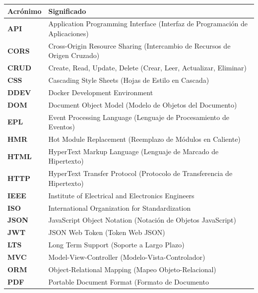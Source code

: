 \documentclass[12pt,a4paper,oneside]{report}
\begin{document}
\begin{longtable}[]{@{}
  >{\raggedright\arraybackslash}p{}
  >{\raggedright\arraybackslash}p{}@{}}
\toprule\noalign{}
\begin{minipage}[b]{\linewidth}\raggedright
Acrónimo
\end{minipage} & \begin{minipage}[b]{\linewidth}\raggedright
Significado
\end{minipage} \\
\midrule\noalign{}
\endhead
\bottomrule\noalign{}
\endlastfoot
\textbf{API} & Application Programming Interface (Interfaz de
Programación de Aplicaciones) \\
\textbf{CORS} & Cross-Origin Resource Sharing (Intercambio de Recursos
de Origen Cruzado) \\
\textbf{CRUD} & Create, Read, Update, Delete (Crear, Leer, Actualizar,
Eliminar) \\
\textbf{CSS} & Cascading Style Sheets (Hojas de Estilo en Cascada) \\
\textbf{DDEV} & Docker Development Environment \\
\textbf{DOM} & Document Object Model (Modelo de Objetos del
Documento) \\
\textbf{EPL} & Event Processing Language (Lenguaje de Procesamiento de
Eventos) \\
\textbf{HMR} & Hot Module Replacement (Reemplazo de Módulos en
Caliente) \\
\textbf{HTML} & HyperText Markup Language (Lenguaje de Marcado de
Hipertexto) \\
\textbf{HTTP} & HyperText Transfer Protocol (Protocolo de Transferencia
de Hipertexto) \\
\textbf{IEEE} & Institute of Electrical and Electronics Engineers \\
\textbf{ISO} & International Organization for Standardization \\
\textbf{JSON} & JavaScript Object Notation (Notación de Objetos
JavaScript) \\
\textbf{JWT} & JSON Web Token (Token Web JSON) \\
\textbf{LTS} & Long Term Support (Soporte a Largo Plazo) \\
\textbf{MVC} & Model-View-Controller (Modelo-Vista-Controlador) \\
\textbf{ORM} & Object-Relational Mapping (Mapeo Objeto-Relacional) \\
\textbf{PDF} & Portable Document Format (Formato de Documento

\end{longtable}
\end{document}
